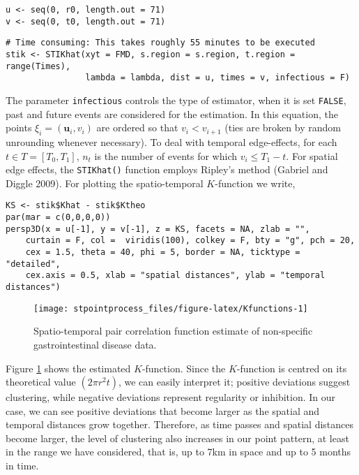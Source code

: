 \begin{verbatim}
u <- seq(0, r0, length.out = 71)
v <- seq(0, t0, length.out = 71)
\end{verbatim}

\begin{verbatim}
# Time consuming: This takes roughly 55 minutes to be executed
stik <- STIKhat(xyt = FMD, s.region = s.region, t.region = range(Times),
                lambda = lambda, dist = u, times = v, infectious = F)
\end{verbatim}

The parameter \texttt{infectious} controls the type of estimator, when it is set \texttt{FALSE}, past and future events are considered for the estimation. In this equation, the points \(\xi_i=(\mathbf{u}_i, v_i)\) are ordered so that \(v_i<v_{i+1}\) (ties are broken by random unrounding whenever necessary). To deal with temporal edge-effects, for each \(t\in T=[T_0,T_1]\), \(n_t\) is the number of events for which \(v_i\leq T_1 - t\). For spatial edge effects, the \texttt{STIKhat()} function employs Ripley's method (Gabriel and Diggle 2009). For plotting the spatio-temporal \(K\)-function we write,

\begin{verbatim}
KS <- stik$Khat - stik$Ktheo
par(mar = c(0,0,0,0))
persp3D(x = u[-1], y = v[-1], z = KS, facets = NA, zlab = "",
    curtain = F, col =  viridis(100), colkey = F, bty = "g", pch = 20, 
    cex = 1.5, theta = 40, phi = 5, border = NA, ticktype = "detailed", 
    cex.axis = 0.5, xlab = "spatial distances", ylab = "temporal distances")
\end{verbatim}

\begin{figure}

{\centering \texttt{[image: stpointprocess\_files/figure-latex/Kfunctions-1]} 

}

\caption{Spatio-temporal pair correlation function estimate of non-specific gastrointestinal disease data.}\label{fig:Kfunctions}
\end{figure}

Figure \ref{fig:Kfunctions} shows the estimated \(K\)-function. Since the \(K\)-function is centred on its theoretical value \((2\pi r^2 t)\), we can easily interpret it; positive deviations suggest clustering, while negative deviations represent regularity or inhibition. In our case, we can see positive deviations that become larger as the spatial and temporal distances grow together. Therefore, as time passes and spatial distances become larger, the level of clustering also increases in our point pattern, at least in the range we have considered, that is, up to 7km in space and up to 5 months in time.

